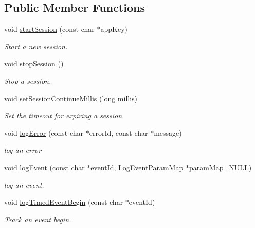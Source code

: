 \subsection*{Public Member Functions}
\begin{DoxyCompactItemize}
\item 
void \hyperlink{classcocos2d_1_1plugin_1_1ProtocolAnalytics_a06e31e415d1354d3abf4775c389a67ae}{start\+Session} (const char $\ast$app\+Key)
\begin{DoxyCompactList}\small\item\em Start a new session. \end{DoxyCompactList}\item 
void \hyperlink{classcocos2d_1_1plugin_1_1ProtocolAnalytics_a75e7cfb9f04fa49b795fd195fe663204}{stop\+Session} ()
\begin{DoxyCompactList}\small\item\em Stop a session. \end{DoxyCompactList}\item 
void \hyperlink{classcocos2d_1_1plugin_1_1ProtocolAnalytics_a037c60ea8869cbaedbdf9202bb7e1b67}{set\+Session\+Continue\+Millis} (long millis)
\begin{DoxyCompactList}\small\item\em Set the timeout for expiring a session. \end{DoxyCompactList}\item 
void \hyperlink{classcocos2d_1_1plugin_1_1ProtocolAnalytics_acc95ad8a3c0c2e3a195605e515a9ee59}{log\+Error} (const char $\ast$error\+Id, const char $\ast$message)
\begin{DoxyCompactList}\small\item\em log an error \end{DoxyCompactList}\item 
void \hyperlink{classcocos2d_1_1plugin_1_1ProtocolAnalytics_a67758ef2c55576858a04b1df3a587b5e}{log\+Event} (const char $\ast$event\+Id, Log\+Event\+Param\+Map $\ast$param\+Map=N\+U\+LL)
\begin{DoxyCompactList}\small\item\em log an event. \end{DoxyCompactList}\item 
void \hyperlink{classcocos2d_1_1plugin_1_1ProtocolAnalytics_ad7677531ddb888fbadcf2fa5211782b8}{log\+Timed\+Event\+Begin} (const char $\ast$event\+Id)
\begin{DoxyCompactList}\small\item\em Track an event begin. \end{DoxyCompactList}\item 

\end{DoxyCompactItemize}
